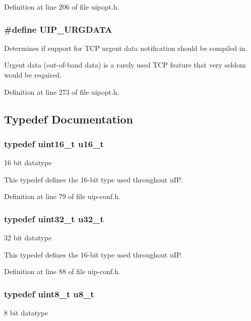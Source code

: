 Definition at line 206 of file uipopt.h.

\hypertarget{group__uipopt_ga51c1cd531ff0afb81620151f2248cd21}{
\subsubsection[{UIP\_\-URGDATA}]{\setlength{\rightskip}{0pt plus 5cm}\#define UIP\_\-URGDATA}}
\label{group__uipopt_ga51c1cd531ff0afb81620151f2248cd21}
Determines if support for TCP urgent data notification should be compiled in.

Urgent data (out-\/of-\/band data) is a rarely used TCP feature that very seldom would be required. 

Definition at line 273 of file uipopt.h.



\subsection{Typedef Documentation}
\hypertarget{group__uipfw_ga77570ac4fcab86864fa1916e55676da2}{
\subsubsection[{u16\_\-t}]{\setlength{\rightskip}{0pt plus 5cm}typedef uint16\_\-t {\bf u16\_\-t}}}
\label{group__uipfw_ga77570ac4fcab86864fa1916e55676da2}
16 bit datatype

This typedef defines the 16-\/bit type used throughout uIP. 

Definition at line 79 of file uip-\/conf.h.

\hypertarget{group__uipfw_ga4c14294869aceba3ef9d4c0c302d0f33}{
\subsubsection[{u32\_\-t}]{\setlength{\rightskip}{0pt plus 5cm}typedef uint32\_\-t {\bf u32\_\-t}}}
\label{group__uipfw_ga4c14294869aceba3ef9d4c0c302d0f33}
32 bit datatype

This typedef defines the 16-\/bit type used throughout uIP. 

Definition at line 88 of file uip-\/conf.h.

\hypertarget{group__uipfw_ga4caecabca98b43919dd11be1c0d4cd8e}{
\subsubsection[{u8\_\-t}]{\setlength{\rightskip}{0pt plus 5cm}typedef uint8\_\-t {\bf u8\_\-t}}}
\label{group__uipfw_ga4caecabca98b43919dd11be1c0d4cd8e}
8 bit datatype

